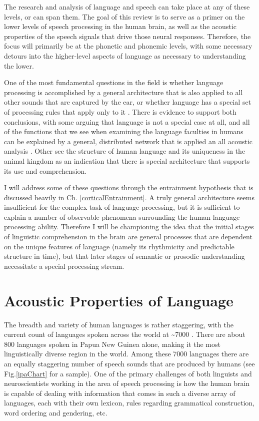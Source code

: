 \documentclass[titlepage]{article}
\begin{document}
  The research and analysis of language and speech can take place at any of these
  levels, or can span them. The goal of this review is to serve as a primer
  on the lower levels of speech processing in the human brain, as well as the
  acoustic properties of the speech signals that drive those neural responses.
  Therefore, the focus will primarily be at the phonetic and phonemic levels, 
  with some necessary detours into the higher-level aspects of language as 
  necessary to understanding the lower.

  One of the most fundamental questions in the field is whether language processing
  is accomplished by a general architecture that is also applied to all other sounds
  that are captured by the ear, or whether language has a special set of processing
  rules that apply only to it \cite{Uddin2018}. There is evidence to support both
  conclusions, with some arguing that language is not a special case at all, and all
  of the functions that we see when examining the language faculties in humans can be
  explained by a general, distributed network that is applied an all acoustic analysis
  \cite{Dick2001}. Other see the structure of human language and its uniqueness in the
  animal kingdom \cite{Chomsky1986,Fodor1983} as an indication that there is special
  architecture that supports its use and comprehension.

  I will address some of these questions
  through the entrainment hypothesis that is discussed heavily in Ch. \ref{corticalEntrainment}.
  A truly general architecture seems insufficient for the complex task of language processing,
  but it is sufficient to explain a number of observable phenomena surrounding the human
  language processing ability. Therefore I will be championing the idea that the initial stages
  of linguistic comprehension in the brain are general processes that are dependent on the unique
  features of language (namely its rhythmicity and predictable structure in time), but that
  later stages of semantic or prosodic understanding necessitate a special processing stream.

\section{Acoustic Properties of Language} \label{acoustics}

  The breadth and variety of human languages is rather staggering, with
  the current count of languages spoken across the world at \textasciitilde 7000 \cite{Simons2017}.
  There are about 800 languages spoken in Papua New Guinea alone, making it the
  most linguistically diverse region in the world. Among these 7000 languages
  there are an equally staggering number of speech sounds that are produced by humans
  (see Fig.\ref{ipaChart} for a sample). One of the primary challenges of both
  linguists and neuroscientists working in the area of speech processing is
  how the human brain is capable of dealing with information that comes in such a diverse
  array of languages, each with their own lexicon, rules regarding grammatical construction,
  word ordering and gendering, etc.
\end{document}
